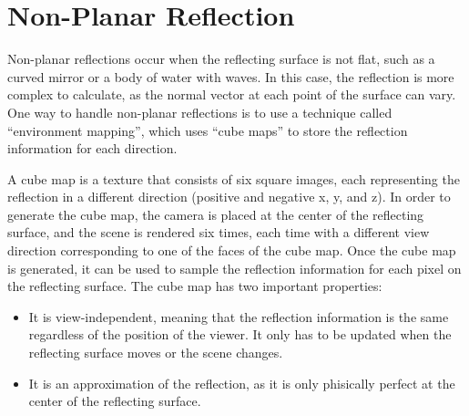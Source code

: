 \section{Non-Planar Reflection}

Non-planar reflections occur when the reflecting surface is not flat, such as a curved mirror or a body of water with waves. In this case, the reflection is more complex to calculate, as the normal vector at each point of the surface can vary. One way to handle non-planar reflections is to use a technique called ``environment mapping'', which uses ``cube maps'' to store the reflection information for each direction.

A cube map is a texture that consists of six square images, each representing the reflection in a different direction (positive and negative x, y, and z). In order to generate the cube map, the camera is placed at the center of the reflecting surface, and the scene is rendered six times, each time with a different view direction corresponding to one of the faces of the cube map. Once the cube map is generated, it can be used to sample the reflection information for each pixel on the reflecting surface. The cube map has two important properties:
\begin{itemize}
    \item It is view-independent, meaning that the reflection information is the same regardless of the position of the viewer. It only has to be updated when the reflecting surface moves or the scene changes.
    \item It is an approximation of the reflection, as it is only phisically perfect at the center of the reflecting surface.
\end{itemize}

